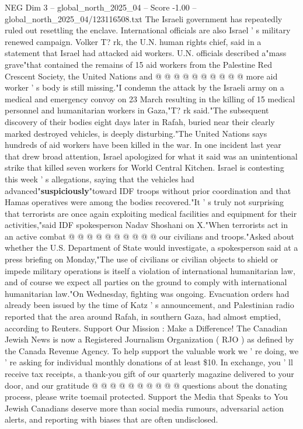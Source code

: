 \begin{textsample}{NEG Dim 3 – global\_north\_2025\_04 – Score -1.00 – global\_north\_2025\_04/123116508.txt}
The Israeli government has repeatedly ruled out resettling the enclave.
International officials are also Israel ' s military renewed campaign.
Volker T? rk, the U.N. human rights chief, said in a statement that Israel had attacked aid workers.
U.N. officials described a"mass grave"that contained the remains of 15 aid workers from the Palestine Red Crescent Society, the United Nations and @ @ @ @ @ @ @ @ @ @ more aid worker ' s body is still missing."I condemn the attack by the Israeli army on a medical and emergency convoy on 23 March resulting in the killing of 15 medical personnel and humanitarian workers in Gaza,"T? rk said."The subsequent discovery of their bodies eight days later in Rafah, buried near their clearly marked destroyed vehicles, is deeply disturbing."The United Nations says hundreds of aid workers have been killed in the war.
In one incident last year that drew broad attention, Israel apologized for what it said was an unintentional strike that killed seven workers for World Central Kitchen.
Israel is contesting this week ' s allegations, saying that the vehicles had advanced"\textbf{suspiciously}"toward IDF troops without prior coordination and that Hamas operatives were among the bodies recovered."It ' s truly not surprising that terrorists are once again exploiting medical facilities and equipment for their activities,"said IDF spokesperson Nadav Shoshani on X."When terrorists act in an active combat @ @ @ @ @ @ @ @ @ @ our civilians and troops."Asked about whether the U.S.
Department of State would investigate, a spokesperson said at a press briefing on Monday,"The use of civilians or civilian objects to shield or impede military operations is itself a violation of international humanitarian law, and of course we expect all parties on the ground to comply with international humanitarian law."On Wednesday, fighting was ongoing.
Evacuation orders had already been issued by the time of Katz ' s announcement, and Palestinian radio reported that the area around Rafah, in southern Gaza, had almost emptied, according to Reuters.
Support Our Mission : Make a Difference!
The Canadian Jewish News is now a Registered Journalism Organization ( RJO ) as defined by the Canada Revenue Agency.
To help support the valuable work we ' re doing, we ' re asking for individual monthly donations of at least \$10.
In exchange, you ' ll receive tax receipts, a thank-you gift of our quarterly magazine delivered to your door, and our gratitude @ @ @ @ @ @ @ @ @ @ questions about the donating process, please write toemail protected.
Support the Media that Speaks to You Jewish Canadians deserve more than social media rumours, adversarial action alerts, and reporting with biases that are often undisclosed.

\end{textsample}
